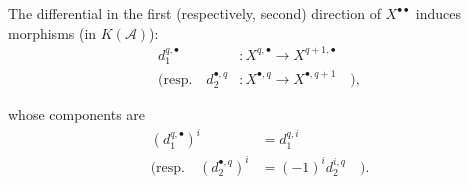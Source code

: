 The differential in the first (respectively, second) direction of
$X^{\bullet\bullet}$ induces morphisms (in $K(\mathcal A)$):
\[
\begin{aligned}
d_1^{q,\bullet}&\colon X^{q,\bullet}\longrightarrow X^{q+1,\bullet}\\
(\text{resp.}\quad
d_2^{\bullet,q}&\colon X^{\bullet,q}\longrightarrow X^{\bullet,q+1}\quad),
\end{aligned}
\]

whose components are
\[
\begin{aligned}
(d_1^{q,\bullet})^i&=d_1^{q,i}\\
(\text{resp.}\quad(d_2^{\bullet,q})^i&=(-1)^i d_2^{i,q}\quad).
\end{aligned}
\]
\endgroup
